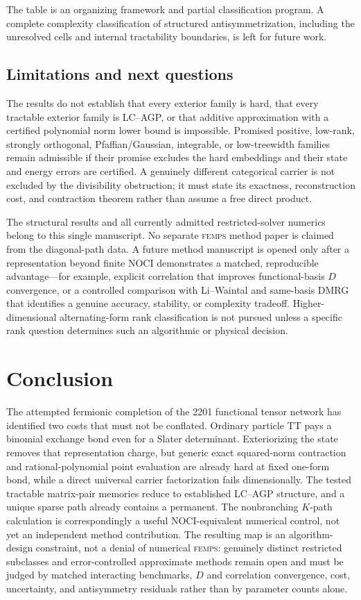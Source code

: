 \documentclass[aps,pra,reprint,superscriptaddress,nofootinbib,longbibliography,showkeys]{revtex4-2}
\theoremstyle{definition}
\newcommand{\FEMPS}{\textnormal{\textsc{femps}}}
\begin{document}
The table is an organizing framework and partial classification program.  A
complete complexity classification of structured antisymmetrization,
including the unresolved cells and internal tractability boundaries, is left
for future work.

\subsection{Limitations and next questions}

The results do not establish that every exterior family is hard, that every
tractable exterior family is LC--AGP, or that additive approximation with a
certified polynomial norm lower bound is impossible.  Promised positive,
low-rank, strongly orthogonal, Pfaffian/Gaussian, integrable, or low-treewidth
families remain admissible if their promise excludes the hard embeddings and
their state and energy errors are certified.  A genuinely different
categorical carrier is not excluded by the divisibility obstruction; it must
state its exactness,
reconstruction cost, and contraction theorem rather than assume a free direct
product.

The structural results and all currently admitted restricted-solver numerics
belong to this single manuscript.  No separate \FEMPS{} method paper is claimed
from the diagonal-path data.  A future method manuscript is opened only after
a representation beyond finite NOCI demonstrates a matched, reproducible
advantage---for example, explicit correlation that improves functional-basis
$D$ convergence, or a controlled comparison with Li--Waintal and same-basis
DMRG that identifies a genuine accuracy, stability, or complexity tradeoff.
Higher-dimensional alternating-form rank classification is not pursued unless
a specific rank question determines such an algorithmic or physical decision.

\section{Conclusion}

The attempted fermionic completion of the 2201 functional tensor network has
identified two costs that must not be conflated.  Ordinary particle TT pays a
binomial exchange bond even for a Slater determinant.  Exteriorizing the state
removes that representation charge, but generic exact squared-norm contraction
and rational-polynomial point evaluation are already hard at fixed one-form
bond, while a direct universal carrier
factorization fails dimensionally.  The tested tractable matrix-pair memories
reduce to established LC--AGP structure, and a unique sparse path already
contains a permanent.  The nonbranching $K$-path calculation is correspondingly
a useful NOCI-equivalent numerical control, not yet an independent method
contribution.  The resulting map is an algorithm-design constraint, not a
denial of numerical \FEMPS{}: genuinely distinct restricted subclasses and
error-controlled approximate methods remain open and must be judged by matched
interacting benchmarks, $D$ and correlation convergence, cost, uncertainty,
and antisymmetry residuals rather than by parameter counts alone.
\end{document}
